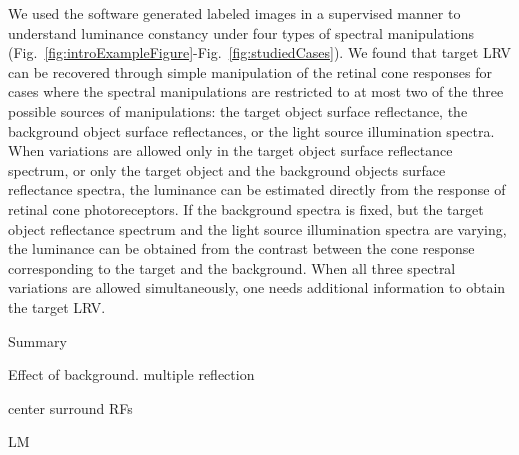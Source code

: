 \documentclass{jov}
\begin{document}
We used the software generated labeled images in a supervised manner to understand luminance constancy under four types of spectral manipulations (Fig.~\ref{fig:introExampleFigure}-Fig.~\ref{fig:studiedCases}). We found that target LRV can be recovered through simple manipulation of the retinal cone responses for cases where the spectral manipulations are restricted to at most two of the three possible sources of manipulations: the target object surface reflectance, the background object surface reflectances, or the light source illumination spectra. When variations are allowed only in the target object surface reflectance spectrum, or only the target object and the background objects surface reflectance spectra, the luminance can be estimated directly from the response of retinal cone photoreceptors. If the background spectra is fixed, but the target object reflectance spectrum and the light source illumination spectra are varying, the luminance can be obtained from the contrast between the cone response corresponding to the target and the background. When all three spectral variations are allowed simultaneously, one needs additional information to obtain the target LRV. 


Summary

Effect of background. multiple reflection

center surround RFs

LM



\end{document}
